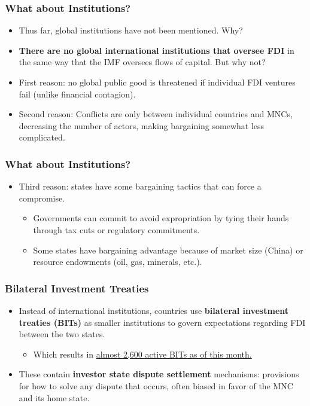 \documentclass[handout]{beamer}
\begin{document}
\begin{frame} 
	\frametitle{\LARGE{What about Institutions?}}
	\begin{itemize}
		\item Thus far, global institutions have not been mentioned. Why? \pause 
		\item \textbf{There are no global international institutions that oversee FDI} in the same way that the IMF oversees flows of capital. But why not?
		\item First reason: no global public good is threatened if individual FDI ventures fail (unlike financial contagion). \pause 
		\item Second reason: Conflicts are only between individual countries and MNCs, decreasing the number of actors, making bargaining somewhat less complicated.  
		
	\end{itemize}
\end{frame}

\begin{frame} 
	\frametitle{\LARGE{What about Institutions?}}
	\begin{itemize}
		\item Third reason: states have some bargaining tactics that can force a compromise. \pause
		\begin{itemize}
			\item Governments can commit to avoid expropriation by tying their hands through tax cuts or regulatory commitments. \pause 
			\item Some states have bargaining advantage because of market size (China) or resource endowments (oil, gas, minerals, etc.).  
		\end{itemize}       
	\end{itemize}
\end{frame}

\begin{frame} 
	\frametitle{\LARGE{Bilateral Investment Treaties}}
	\begin{itemize}
		\item Instead of international institutions, countries use \textbf{bilateral investment treaties (BITs)} as smaller institutions to govern expectations regarding FDI between the two states. \pause 
		\begin{itemize}
			\item Which results in \href{https://investmentpolicy.unctad.org/international-investment-agreements/iia-mapping}{almost 2,600 active BITs as of this month.}
		\end{itemize}
		\item These contain \textbf{investor state dispute settlement} mechanisms: provisions for how to solve any dispute that occurs, often biased in favor of the MNC and its home state.	
	\end{itemize}
\end{frame}
\end{document}
